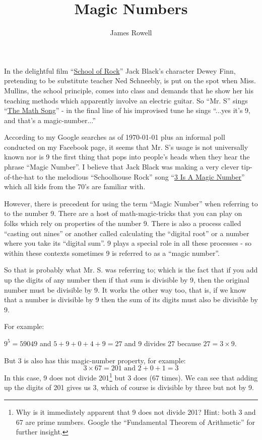 \documentclass{article}
\title{Magic Numbers}
\author{James Rowell}
\newenvironment{jprIn}{\begin{adjustwidth}{2em}{}}{\end{adjustwidth}}
\begin{document}
\maketitle

In the delightful film ``\href{https://en.wikipedia.org/wiki/School_of_Rock}{School of Rock}'' Jack Black's character Dewey Finn,
pretending to be substitute teacher Ned Schneebly, is put on the spot when
Miss. Mullins, the school principle, comes into class and demands that he show
her his teaching methods which apparently involve an electric guitar.
So ``Mr. S'' sings ``\href{https://www.youtube.com/watch?v=aa8U0nL-KXg}{The Math Song}'' - in the final line of his
improvised tune he sings ``...yes it's 9, and that's a magic-number...''

According to my Google searches as of \today{} plus an informal poll conducted on my Facebook page,
it seems that Mr. S's usage is not universally known nor is 9 the first thing that pops into people's heads when they
hear the phrase ``Magic Number''. I believe that Jack Black was making a very clever
tip-of-the-hat to the melodious ``Schoolhouse Rock'' song ``\href{https://youtu.be/aU4pyiB-kq0}{3 Is A Magic Number}''
which all kids from the 70's are familiar with.

However, there is precedent for using the term ``Magic Number'' when referring to to the number 9.
There are a host of math-magic-tricks that you can play on folks which rely on properties of the number 9.
There is also a process called ``casting out nines'' or another 
called calculating the ``digital root'' or a number where you take its ``digital sum''. 9
plays a special role in all these processes - so within these contexts sometimes 9
is referred to as a ``magic number''.

So that is probably what Mr. S. was referring to; which is the fact that if you add up the digits of
any number then if that sum is divisible by 9, then the original number
must be divisible by 9. It works the other way too, that is, if we know
that a number is divisible by 9 then the sum of its digits must also be
divisible by 9.


For example:
\begin{jprIn}
$9^5=59049$ and $5+9+0+4+9=27$ and 9 divides 27 because $27 = 3\times{}9$.
\end{jprIn}

But 3 is also has this magic-number property, for example:
\[ 3\times{}67=201 \text{ and } 2+0+1=3\]
In this case, 9 does not divide 201\footnote{Why is it immediately apparent that 9 does not divide 201? Hint: both 3 and 67 are prime numbers.
Google the ``Fundamental Theorem of Arithmetic'' for further insight.}
but 3 does (67 times).
We can see that adding up the digits of 201 gives us 3, which of course is divisible by three but not by 9.
\end{document}
